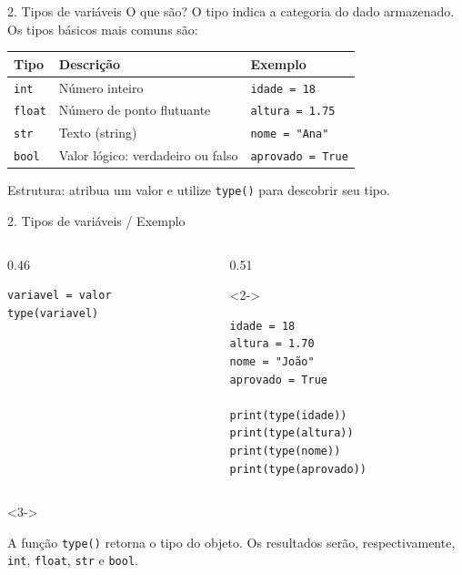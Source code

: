 \begin{frame}[t]{2. Tipos de variáveis}
O que são? O tipo indica a categoria do dado armazenado. Os tipos básicos mais comuns são:\par
\begin{tabularx}{\linewidth}{@{}lXl@{}}
\toprule
\textbf{Tipo} & \textbf{Descrição} & \textbf{Exemplo} \\
\midrule
\texttt{int} & Número inteiro & \texttt{idade = 18} \\
\texttt{float} & Número de ponto flutuante & \texttt{altura = 1.75} \\
\texttt{str} & Texto (string) & \texttt{nome = "Ana"} \\
\texttt{bool} & Valor lógico: verdadeiro ou falso & \texttt{aprovado = True} \\
\bottomrule
\end{tabularx}
\par\smallskip
Estrutura: atribua um valor e utilize \texttt{type()} para descobrir seu tipo.\par
\end{frame}

\begin{frame}[fragile,t]{2. Tipos de variáveis / Exemplo}
\begin{columns}[T,onlytextwidth]
\begin{column}{0.46\textwidth}
\begin{lstlisting}
variavel = valor
type(variavel)
\end{lstlisting}
\end{column}
\begin{column}{0.51\textwidth}
\begin{visibleenv}<2->
\begin{lstlisting}
idade = 18
altura = 1.70
nome = "João"
aprovado = True

print(type(idade))
print(type(altura))
print(type(nome))
print(type(aprovado))
\end{lstlisting}
\end{visibleenv}
\end{column}
\end{columns}
\begin{visibleenv}<3->
\begin{EMASCnote}
A função \texttt{type()} retorna o tipo do objeto. Os resultados serão, respectivamente, \texttt{int}, \texttt{float}, \texttt{str} e \texttt{bool}.
\end{EMASCnote}
\end{visibleenv}
\end{frame}

